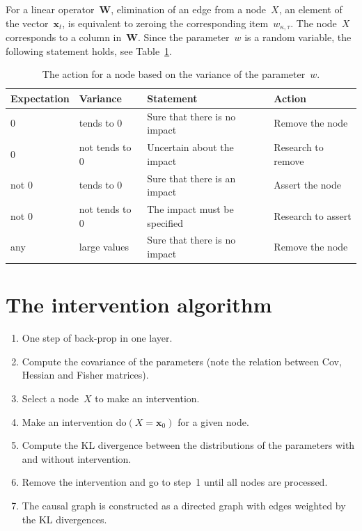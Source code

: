 \documentclass[12pt]{article}
\newcommand{\doc}{\mathrm{do}}
\begin{document}
For a linear operator~$\mathbf{W}$, elimination of an edge from a node~$X$,
an element of the vector~$\mathbf{x}_t$,
is equivalent to zeroing the corresponding item~$w_{\kappa,\tau}$.
The node~$X$ corresponds to a column in~$\mathbf{W}$.
Since the parameter~$w$ is a random variable, the following statement holds, see Table~\ref{tab:causal-criterion}.
\begin{table}[hp]
    \label{tab:causal-criterion}
    \caption{The action for a node based on the variance of the parameter~$w$.}
    \begin{tabular}{|l|l|l|l|}
        \hline
        \bf{Expectation} & \bf{Variance} & \bf{Statement} & \bf{Action} \\ \hline \hline
        0       & tends to 0        & Sure that there is no impact  & Remove the node\\
        0       & not tends to 0    & Uncertain about the impact    & Research to remove\\
        not 0   & tends to 0        & Sure that there is an impact  & Assert the node\\
        not 0   & not tends to 0    & The impact must be specified  & Research to assert\\
        any     & large values      & Sure that there is no impact  & Remove the node\\
        \hline
    \end{tabular}
\end{table}

\section{The intervention algorithm}
\begin{enumerate}
    \item One step of back-prop in one layer.
    \item Compute the covariance of the parameters (note the relation between Cov, Hessian and Fisher matrices).
    \item Select a node~$X$ to make an intervention.
    \item Make an intervention $\doc(X=\mathbf{x}_0)$ for a given node.
    \item Compute the KL divergence between the distributions of the parameters with and without intervention.
    \item Remove the intervention and go to step~1 until all nodes are processed.
    \item The causal graph is constructed as a directed graph with edges weighted by the KL divergences.
\end{enumerate}
\end{document}
